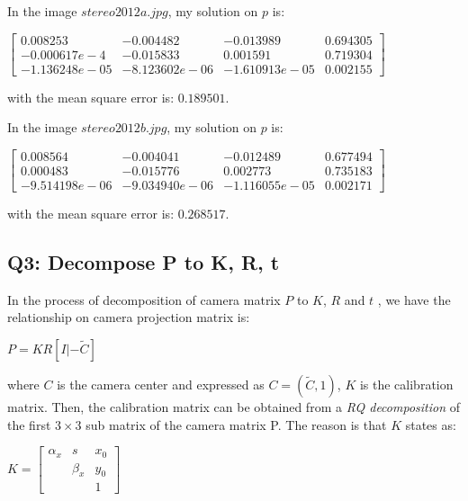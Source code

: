 \documentclass[12pt]{article}
\begin{document}
In the image $stereo2012a.jpg$, my solution on $p$ is:

\begin{center}
$\begin{bmatrix} 0.008253 & -0.004482 & -0.013989 & 0.694305 \\ -0.000617e-4 & -0.015833 & 0.001591 & 0.719304 \\  -1.136248e-05 & -8.123602e-06 & -1.610913e-05 & 0.002155 \end{bmatrix}$
\end{center}

with the mean square error is: $0.189501$.

In the image $stereo2012b.jpg$, my solution on $p$ is:

\begin{center}
$\begin{bmatrix} 0.008564 & -0.004041 & -0.012489 & 0.677494 \\ 0.000483 & -0.015776 & 0.002773 & 0.735183 \\  -9.514198e-06 & -9.034940e-06 &-1.116055e-05 & 0.002171 \end{bmatrix}$
\end{center}

with the mean square error is: $0.268517$.

\subsection{Q3: Decompose P to K, R, t}
\label{sec:decompose}

In the process of decomposition of camera matrix $P$ to $K$, $R$ and $t$ , we have the relationship on camera projection matrix is:

\begin{center}
$P = KR[I | - \tilde{C}]$
\end{center}

where $C$ is the camera center and expressed as $C = (\tilde{C}, 1)$, $K$ is the calibration matrix. Then, the calibration matrix can be obtained from a \textit{RQ decomposition} of the first $3 \times 3$ sub matrix of the camera matrix P. The reason is that $K$ states as:

\begin{center}

$K = \begin{bmatrix} \alpha_{x} & s & x_{0} \\  ~ & \beta_{x} & y_{0} \\  ~ & ~ & 1 \end{bmatrix}$

\end{center}
\end{document}
